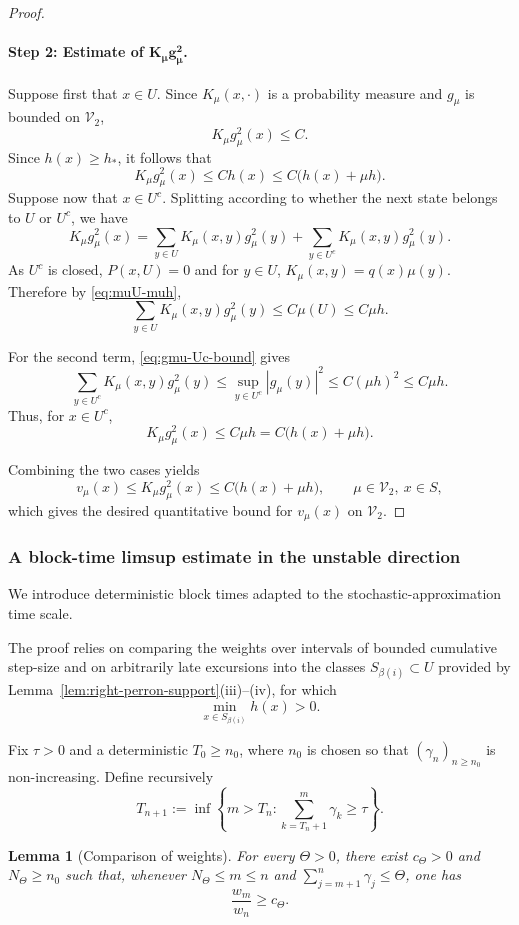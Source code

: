 \documentclass[10pt,letterpaper]{article}
\theoremstyle{compactplain}
\newtheorem{lemma}[theorem]{Lemma}
\theoremstyle{compactdefinition}
\newcommand{\1}{\mathds{1}}
\begin{document}
\begin{proof}
\paragraph{Step 2: Estimate of \(\boldsymbol{K_\mu g_\mu^2}\).}
Suppose first that \(x\in U\). Since \(K_\mu(x,\cdot)\) is a probability
measure and \(g_\mu\) is bounded on \(\mathcal V_2\),
\[
K_\mu g_\mu^2(x)\leq C.
\]
Since \(h(x)\geq h_*\), it follows that
\[
K_\mu g_\mu^2(x)
\leq
Ch(x)
\leq
C\bigl(h(x)+\mu h\bigr).
\]
Suppose now that \(x\in U^c\). Splitting according to whether the next state belongs to \(U\) or \(U^c\), we have
\[
K_\mu g_\mu^2(x)
=
\sum_{y\in U}K_\mu(x,y)g_\mu^2(y)
+
\sum_{y\in U^c}K_\mu(x,y)g_\mu^2(y).
\]
As \(U^c\) is closed, \(P(x,U)=0\) and for \(y\in U\), \(K_\mu(x,y)=q(x)\mu(y)\). Therefore by \eqref{eq:muU-muh},
\[
\sum_{y\in U}K_\mu(x,y)g_\mu^2(y) \leq C\mu(U)\leq C\mu h.
\]


For the second term, \eqref{eq:gmu-Uc-bound} gives
\[
\sum_{y\in U^c}K_\mu(x,y)g_\mu^2(y)
\leq
\sup_{y\in U^c}|g_\mu(y)|^2
\leq
C(\mu h)^2 \leq C \mu h.
\]
Thus, for \(x\in U^c\),
\[
K_\mu g_\mu^2(x)
\leq
C\mu h
=
C\bigl(h(x)+\mu h\bigr).
\]


Combining the two cases yields
\[
v_\mu(x)
\leq
K_\mu g_\mu^2(x)
\leq
C\bigl(h(x)+\mu h\bigr),
\qquad
\mu\in\mathcal V_2,\ x\in S,
\]
which gives the desired quantitative bound for $v_\mu(x)$ on $\mathcal V_2$.
\end{proof}




\subsubsection{A block-time limsup estimate in the unstable direction}
We introduce deterministic block times adapted to the
stochastic-approximation time scale. 

The proof relies on comparing the weights over intervals of bounded cumulative
step-size and on arbitrarily late excursions into the classes
\(S_{\beta(i)}\subset U\) provided by
Lemma~\ref{lem:right-perron-support}\textup{(iii)--(iv)}, for which
\[
\min_{x\in S_{\beta(i)}}h(x)>0.
\]





Fix \(\tau>0\) and a deterministic \(T_0\geq n_0\), where \(n_0\) is chosen so
that \((\gamma_n)_{n\geq n_0}\) is non-increasing. Define recursively
\[
T_{n+1}
:=
\inf\left\{
m>T_n:
\sum_{k=T_n+1}^{m}\gamma_k\geq \tau
\right\}.
\]


\begin{lemma}[Comparison of weights]
\label{lem:controlled-window-weights}
For every \(\Theta>0\), there exist \(c_\Theta>0\) and
\(N_\Theta\geq n_0\) such that, whenever \(N_\Theta\leq m\leq n\) and
\(\sum\limits_{j=m+1}^{n}\gamma_j\leq\Theta\), one has
\[
\frac{w_m}{w_n}\geq c_\Theta.
\]
\end{lemma}
\end{document}
